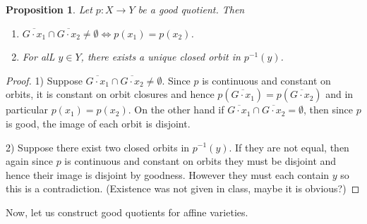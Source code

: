 \documentclass{article}
\newtheorem{prop}{Proposition}
\theoremstyle{definition}
\begin{document}
\begin{prop}
	Let $p:X\to Y$ be a good quotient. Then 
	\begin{enumerate}
		\item $\overline{G\cdot x_1} \cap \overline{G\cdot x_2} \neq \emptyset \iff  p(x_1)=p(x_2)$.
		\item For alL $y\in Y$, there exists a unique closed orbit in $p^{-1}(y)$.
	\end{enumerate}
\end{prop}
\begin{proof}
	1) Suppose $\overline{G\cdot x_1} \cap \overline{G\cdot x_2} \neq \emptyset$. Since $p$ is continuous and constant on orbits, it is constant on orbit closures and hence $p(\overline{G\cdot x_1}) = p(\overline{G\cdot x_2})$ and in particular $p(x_1)=p(x_2)$. On the other hand if $\overline{G\cdot x_1} \cap \overline{G\cdot x_2} = \emptyset$, then since $p$ is good, the image of each orbit is disjoint. \vspace{1em}
	
	2) Suppose there exist two closed orbits in $p^{-1}(y)$. If they are not equal, then again since $p$ is continuous and constant on orbits they must be disjoint and hence their image is disjoint by goodness. However they must each contain $y$ so this is a contradiction. (Existence was not given in class, maybe it is obvious?)
\end{proof}
Now, let us construct good quotients for affine varieties.
\end{document}
